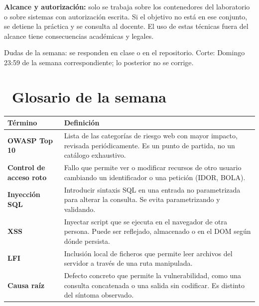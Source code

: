\documentclass[11pt,a4paper]{article}
\newcommand{\iconotexto}[2]{\textcolor{cyanNeon}{\faIcon{#1}}~#2}
\begin{document}
\begin{tcolorbox}[cajaMejora]\textbf{Alcance y autorización:} solo se trabaja sobre los contenedores del laboratorio o sobre sistemas con autorización escrita. Si el objetivo no está en ese conjunto, se detiene la práctica y se consulta al docente. El uso de estas técnicas fuera del alcance tiene consecuencias académicas y legales.
\end{tcolorbox}

\begin{cajaRecuerda}Dudas de la semana: se responden en clase o en el repositorio. Corte: Domingo 23:59 de la semana correspondiente; lo posterior no se corrige.
\end{cajaRecuerda}

\clearpage

\section{\iconotexto{book}{Glosario de la semana}}

\small
\begin{longtable}{@{}>{\raggedright\arraybackslash}p{4.2cm}>{\raggedright\arraybackslash}p{\dimexpr\linewidth-4.2cm-12pt\relax}@{}}
\toprule
\textbf{Término} & \textbf{Definición}\\
\midrule
\endhead
\bottomrule
\endlastfoot
\textbf{OWASP Top 10} & Lista de las categorías de riesgo web con mayor impacto, revisada periódicamente. Es un punto de partida, no un catálogo exhaustivo.\\
\textbf{Control de acceso roto} & Fallo que permite ver o modificar recursos de otro usuario cambiando un identificador o una petición (IDOR, BOLA).\\
\textbf{Inyección SQL} & Introducir sintaxis SQL en una entrada no parametrizada para alterar la consulta. Se evita parametrizando y validando.\\
\textbf{XSS} & Inyectar script que se ejecuta en el navegador de otra persona. Puede ser reflejado, almacenado o en el DOM según dónde persista.\\
\textbf{LFI} & Inclusión local de ficheros que permite leer archivos del servidor a través de una ruta manipulada.\\
\textbf{Causa raíz} & Defecto concreto que permite la vulnerabilidad, como una consulta concatenada o una salida sin codificar. Es distinto del síntoma observado.\\
\end{longtable}
\end{document}
